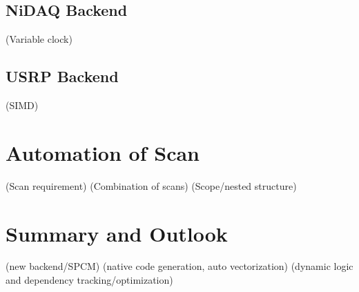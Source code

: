 \subsection{NiDAQ Backend}
(Variable clock)

\subsection{USRP Backend}
(SIMD)

\section{Automation of Scan}
\label{ch:computer-control:scan}

(Scan requirement)
(Combination of scans)
(Scope/nested structure)

\section{Summary and Outlook}
\label{ch:computer-control:summary}
(new backend/SPCM)
(native code generation, auto vectorization)
(dynamic logic and dependency tracking/optimization)
